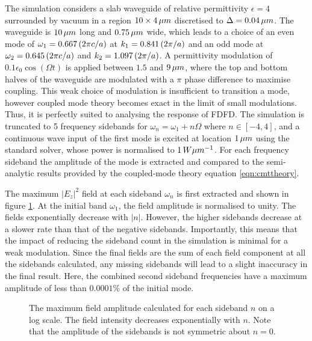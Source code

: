 The simulation considers a slab waveguide of relative permittivity $\epsilon= 4$ surrounded by vacuum in a region $10 \times 4  \mskip3mu \mu m$ discretised to $\Delta = 0.04 \mskip3mu  \mu m$. The waveguide is $10  \mskip3mu \mu m$ long and $0.75  \mskip3mu \mu m$ wide, which leads to a choice of an even mode of $\omega_1 = 0.667  \mskip3mu (2\pi c/a)$ at $k_1 = 0.841 \mskip3mu  (2\pi /a)$ and an odd mode at $\omega_2 = 0.645 \mskip3mu  (2\pi c/a)$ and $k_2 = 1.097 \mskip3mu  (2\pi /a)$. A permittivity modulation of $0.1 \epsilon_0 \cos(\Omega t)$ is applied between $1.5$ and $9 \mskip3mu  \mu m$, where the top and bottom halves of the waveguide are modulated with a $\pi$ phase difference to maximise coupling. This weak choice of modulation is insufficient to transition a mode, however coupled mode theory becomes exact in the limit of small modulations. Thus, it is perfectly suited to analysing the response of FDFD. The simulation is truncated to 5 frequency sidebands for $\omega_n = \omega_1 + n \Omega$ where $n \in [-4,4]$, and a continuous wave input of the first mode is excited at location $1 \mskip3mu  \mu m$ using the standard solver, whose power is normalised to $1  \mskip3mu W \mu m^{-1}$. For each frequency sideband the amplitude of the mode is extracted and compared to the semi-analytic results provided by the coupled-mode theory equation \ref{eqn:cmttheory}.

The maximum $|E_z|^2$ field at each sideband $\omega_n$ is first extracted and shown in figure \ref{fig:sideamp}. At the initial band $\omega_1$, the field amplitude is normalised to unity. The fields exponentially decrease with $|n|$. However, the higher sidebands decrease at a slower rate than that of the negative sidebands. Importantly, this means that the impact of reducing the sideband count in the simulation is minimal for a weak modulation. Since the final fields are the sum of each field component at all the sidebands calculated, any missing sidebands will lead to a slight inaccuracy in the final result. Here, the combined second sideband frequencies have a maximum amplitude of less than $0.0001 \% $ of the initial mode.

\begin{figure}[t]
	\centering
	\setlength{\figH}{\textwidth}
	\setlength{\figW}{\textwidth}
	
	\caption[Maximum $|E_z(\omega_n)|$ field amplitude at each sideband $n$.]{The maximum field amplitude calculated for each sideband $n$ on a log scale. The field intensity decreases exponentially with $n$. Note that the amplitude of the sidebands is not symmetric about $n=0$.}
	\label{fig:sideamp}
\end{figure}

